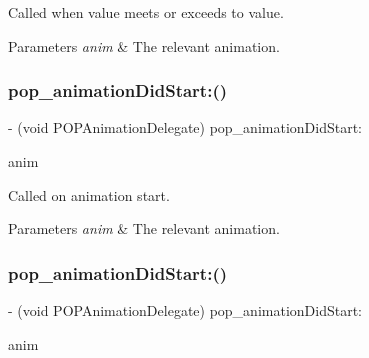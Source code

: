 Called when value meets or exceeds to value. 
\begin{DoxyParams}{Parameters}
{\em anim} & The relevant animation. \\
\hline
\end{DoxyParams}
\mbox{\label{protocol_p_o_p_animation_delegate_01-p_af4187aefc2cb3c5df86a10722872aef3}} 
\subsubsection{\texorpdfstring{pop\+\_\+animation\+Did\+Start\+:()}{pop\_animationDidStart:()}\hspace{0.1cm}{\footnotesize\ttfamily [1/3]}}
{\footnotesize\ttfamily -\/ (void P\+O\+P\+Animation\+Delegate) pop\+\_\+animation\+Did\+Start\+: \begin{DoxyParamCaption}\item[{(\mbox{\hyperlink{interface_p_o_p_animation}{P\+O\+P\+Animation}} $\ast$)}]{anim }\end{DoxyParamCaption}\hspace{0.3cm}{\ttfamily [optional]}}

Called on animation start. 
\begin{DoxyParams}{Parameters}
{\em anim} & The relevant animation. \\
\hline
\end{DoxyParams}
\mbox{\label{protocol_p_o_p_animation_delegate_01-p_af4187aefc2cb3c5df86a10722872aef3}} 
\subsubsection{\texorpdfstring{pop\+\_\+animation\+Did\+Start\+:()}{pop\_animationDidStart:()}\hspace{0.1cm}{\footnotesize\ttfamily [2/3]}}
{\footnotesize\ttfamily -\/ (void P\+O\+P\+Animation\+Delegate) pop\+\_\+animation\+Did\+Start\+: \begin{DoxyParamCaption}\item[{(\mbox{\hyperlink{interface_p_o_p_animation}{P\+O\+P\+Animation}} $\ast$)}]{anim }\end{DoxyParamCaption}\hspace{0.3cm}{\ttfamily [optional]}}

